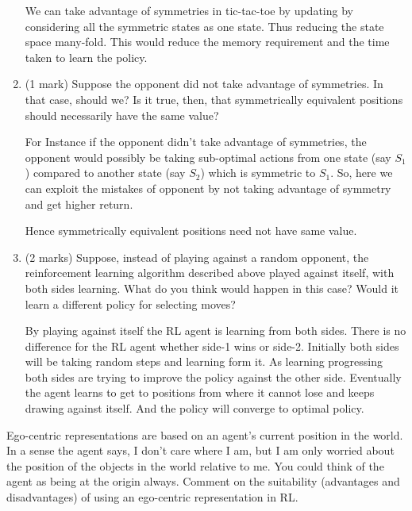 \documentclass[addpoints,12pt,solution]{exam}
\begin{document}
\begin{questions}
\begin{enumerate}[label=(\alph*)]
\begin{solution}
We can take advantage of symmetries in tic-tac-toe by updating by considering all the symmetric states as one state. Thus reducing the state space many-fold. This would reduce the memory requirement and the time taken to learn the policy.
\end{solution}

    \item (1 mark) Suppose the opponent did not take advantage of symmetries. In that case, should we? Is it true, then, that symmetrically equivalent positions should necessarily have the same value? 
    
\begin{solution}

For Instance if the opponent didn't take advantage of symmetries, the opponent would possibly be taking sub-optimal actions from one state (say $S_{1}$) compared to another state (say $S_{2}$) which is symmetric to $S_{1}$. So, here we can exploit the mistakes of opponent by not taking advantage of symmetry and get higher return.

Hence symmetrically equivalent positions need not have same value. 
\end{solution}

    \item (2 marks) Suppose, instead of playing against a random opponent, the reinforcement learning algorithm described above played against itself, with both sides learning. What do you think  would happen in this case? Would it learn a different policy for selecting moves? 
    
\begin{solution}

By playing against itself the RL agent is learning from both sides. There is no difference for the RL agent whether side-1 wins or side-2. Initially both sides will be taking random steps and learning form it. As learning progressing both sides are trying to improve the policy against the other side. Eventually the agent learns to get to positions from where it cannot lose and keeps drawing against itself.
And the policy will converge to optimal policy.

\end{solution}

\end{enumerate}

\question[1]Ego-centric representations are based on an agent's current
position in the world. In a sense the agent says, I don’t care where
I am, but I am only worried about the position of the objects in the
world relative to me. You could think of the agent as being at the origin
always. Comment on the suitability (advantages and disadvantages)
of using an ego-centric representation in RL.


\end{questions}
\end{document}
